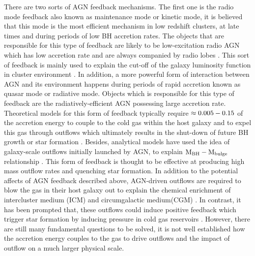 \documentclass[../main.tex]{subfiles}
\begin{document}
There are two sorts of AGN feedback mechanisms. The first one is the radio mode feedback also known as maintenance mode or kinetic mode, it is believed that this mode is the most efficient mechanism in low redshift clusters, at late times and during periods of low BH accretion rates. The objects that are responsible for this type of feedback are likely to be low-excitation radio AGN which has low accretion rate and are always companied by radio lobes \citep{churazov2005supermassive,bower2006breaking,mccarthy2011gas}. This sort of feedback is mainly used to explain the cut-off of the galaxy luminosity function in cluster environment \citep{bower2006breaking,croton2006many,somerville2008semi}. In addition, a more powerful form of interaction between AGN and its environment happens during periods of rapid accretion known as quasar mode or radiative mode. Objects which is responsible for this type of feedback are the radiatively-efficient AGN possessing large accretion rate. Theoretical models for this form of feedback typically require $\rm \approx 0.005-0.15$ of the accretion energy to couple to the cold gas within the host galaxy and to expel this gas through outflows which ultimately results in the shut-down of future BH growth or star formation \citep{benson2003shapes,hopkins2006normalization,debuhr2012galaxy}. Besides, analytical models have used the idea of galaxy-scale outflows initially launched by AGN, to explain $\rm M_{BH}-M_{bulge}$ relationship \citep{fabian1999obscured,granato2004physical,king2011large,faucher2012physics}. This form of feedback is thought to be effective at producing high mass outflow rates and quenching star formation. In addition to the potential affects of AGN feedback described above, AGN-driven outflows are required to blow the gas in their host galaxy out to explain the chemical enrichment of intercluster medium (ICM) and circumgalactic medium(CGM) \citep{borgani2008chemical,wiersma2009chemical,fabjan2010simulating,ciotti2010feedback}. In contrast, it has been prompted that, these outflows could induce positive feedback which trigger star formation by inducing pressure in cold gas reservoirs \citep{nayakshin2012quasar,ishibashi2012active,silk2013unleashing}. However, there are still many fundamental questions to be solved, it is not well established how the accretion energy couples to the gas to drive outflows and the impact of outflow on a much larger physical scale. 
\end{document}
